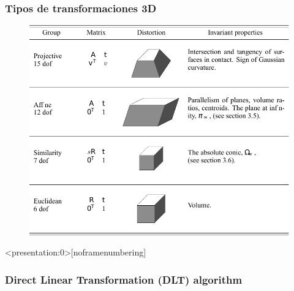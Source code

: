 \begin{frame}
    \frametitle{Tipos de transformaciones 3D}
    \footnotesize
    
    \begin{figure}
        \includegraphics[width=0.6\columnwidth]{./images/transformation_table_3d.pdf}
    \end{figure}
    
\end{frame}


\begin{frame}<presentation:0>[noframenumbering]
    \frametitle{Direct Linear Transformation (DLT) algorithm}
    \footnotesize
    
\end{frame}
